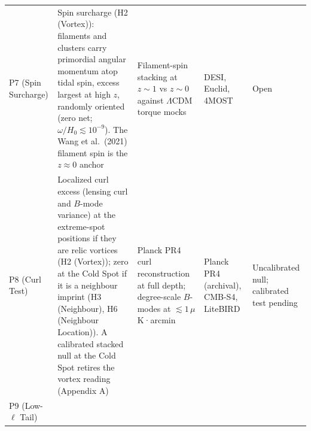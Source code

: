 \documentclass[
]{article}
\begin{document}
\begin{longtable}[]{@{}lllll@{}}
\begin{minipage}[t]{0.11\columnwidth}\raggedright
P7 (Spin Surcharge)\strut
\end{minipage} & \begin{minipage}[t]{0.19\columnwidth}\raggedright
Spin surcharge (H2 (Vortex)): filaments and clusters carry primordial
angular momentum atop tidal spin, excess largest at high \(z\), randomly
oriented (zero net; \(\omega/H_0 \lesssim 10^{-9}\)). The Wang et
al.~(2021) filament spin is the \(z \approx 0\) anchor\strut
\end{minipage} & \begin{minipage}[t]{0.19\columnwidth}\raggedright
Filament-spin stacking at \(z \sim 1\) vs \(z \sim 0\) against
\(\Lambda\)CDM torque mocks\strut
\end{minipage} & \begin{minipage}[t]{0.19\columnwidth}\raggedright
DESI, Euclid, 4MOST\strut
\end{minipage} & \begin{minipage}[t]{0.19\columnwidth}\raggedright
Open\strut
\end{minipage}\tabularnewline
\begin{minipage}[t]{0.11\columnwidth}\raggedright
P8 (Curl Test)\strut
\end{minipage} & \begin{minipage}[t]{0.19\columnwidth}\raggedright
Localized curl excess (lensing curl and \(B\)-mode variance) at the
extreme-spot positions if they are relic vortices (H2 (Vortex)); zero at
the Cold Spot if it is a neighbour imprint (H3 (Neighbour), H6
(Neighbour Location)). A calibrated stacked null at the Cold Spot
retires the vortex reading (Appendix A)\strut
\end{minipage} & \begin{minipage}[t]{0.19\columnwidth}\raggedright
Planck PR4 curl reconstruction at full depth; degree-scale \(B\)-modes
at \(\lesssim 1\,\mu\)K·arcmin\strut
\end{minipage} & \begin{minipage}[t]{0.19\columnwidth}\raggedright
Planck PR4 (archival), CMB-S4, LiteBIRD\strut
\end{minipage} & \begin{minipage}[t]{0.19\columnwidth}\raggedright
Uncalibrated null; calibrated test pending\strut
\end{minipage}\tabularnewline
\begin{minipage}[t]{0.11\columnwidth}\raggedright
P9 (Low-\(\ell\) Tail)\strut
\end{minipage} & \begin{minipage}[t]{0.19\columnwidth}\raggedright

\end{minipage}
\end{longtable}
\end{document}
